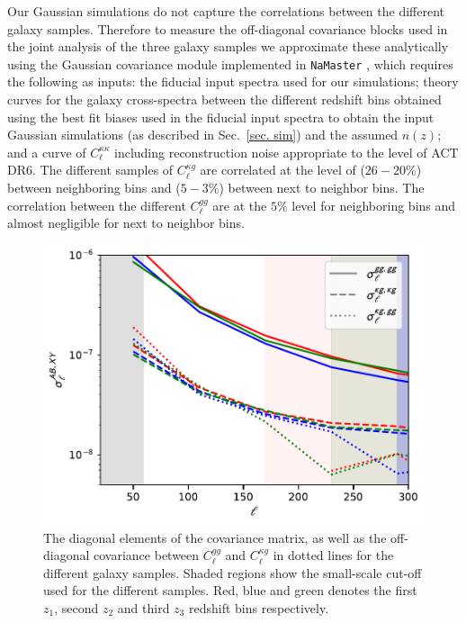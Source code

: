 \documentclass[twocolumn]{aastex631}
\begin{document}
{Our Gaussian simulations do not capture the correlations between the different galaxy samples. Therefore to measure the off-diagonal covariance blocks used in the joint analysis of the three galaxy samples we approximate these analytically using the Gaussian  covariance module implemented in \texttt{NaMaster} \citep{Alonso_2019, Garc_a_Garc_a_2019},
which requires the following as inputs: the fiducial input spectra used for our simulations; {theory curves for the galaxy cross-spectra between the different redshift bins obtained using the best fit biases used in the fiducial input spectra to obtain the input Gaussian simulations }(as described in Sec.~\ref{sec. sim}) and the assumed $n(z)$; and a curve of $C^{\kappa\kappa}_\ell$ including reconstruction noise appropriate to the level of ACT DR6. The different samples of $C^{\kappa{g}}_\ell$ are correlated at the level of ($26-20\%$) between neighboring bins and ($5-3\%$) between next to neighbor bins. The correlation between the different $C^{gg}_\ell$ are at the $5\%$ level for neighboring bins and almost negligible for next to neighbor bins.

\begin{figure}
    \centering
    \includegraphics[width=\linewidth]{figures/diagonal_errors.pdf}
    \caption{The diagonal elements of the covariance matrix, as well as the off-diagonal covariance between $C_\ell^{gg}$ and $C_\ell^{\kappa g}$ in dotted lines for the different galaxy samples. Shaded regions show the small-scale cut-off used for the different samples. Red, blue and green denotes the first $z_1$, second $z_2$ and third $z_3$ redshift bins respectively.}
    \label{fig:covmat_diag}
\end{figure}

}
\end{document}
